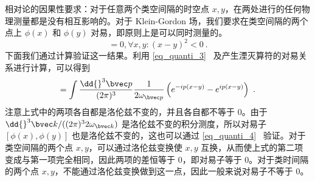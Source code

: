 
相对论的因果性要求：对于任意两个类空间隔的时空点 $x,y$，在两处进行的任何物理测量都是没有相互影响的。对于 Klein-Gordon 场，我们要求在类空间隔的两个点上 $\phi(x)$ 和 $\phi(y)$ 对易，即原则上是可以同时测量的。
\begin{equation}
[\phi(x),\phi(y)]=0,\forall x,y:(x-y)^2<0~.
\end{equation}
下面我们通过计算验证这一结果。利用 \autoref{eq_quanti_3}~ 及产生湮灭算符的对易关系进行计算，可以得到
\begin{equation}
[\phi(x),\phi(y)]=\int \frac{\dd{}^3 \bvec p}{(2\pi)^3} \frac{1}{2\omega_{\bvec p}}
\left( e^{-ip(x-y)}-e^{ip(x-y)}\right)~.
\end{equation}
注意上式中的两项各自都是洛伦兹不变的，并且各自都不等于 $0$。由于 $\dd{}^3 \bvec k/((2\pi)^3 2\omega_{\bvec k})$ 是洛伦兹不变的积分测度，所以对易子 $[\phi(x),\phi(y)]$ 也是洛伦兹不变的，这也可以通过 \autoref{eq_quanti_4}~ 验证。对于类空间隔的两个点 $x,y$，可以通过洛伦兹变换使 $x,y$ 互换，从而使上式的第二项变成与第一项完全相同，因此两项的差恒等于 $0$，即对易子等于 $0$。对于类时间隔的两个点 $x,y$，不能通过洛伦兹变换做到这一点，因此一般来说对易子不等于 $0$。



